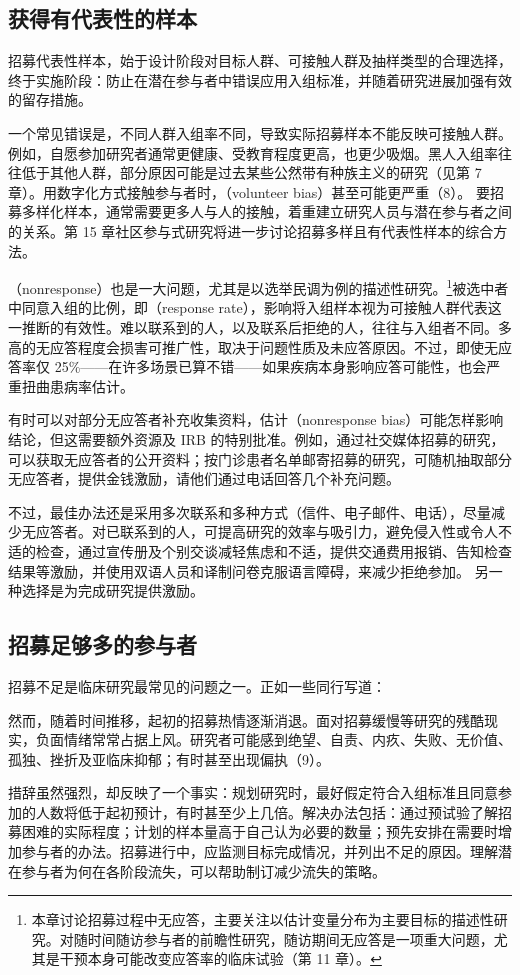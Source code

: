 \subsection{获得有代表性的样本}
招募代表性样本，始于设计阶段对目标人群、可接触人群及抽样类型的合理选择，终于实施阶段：防止在潜在参与者中错误应用入组标准，并随着研究进展加强有效的留存措施。

一个常见错误是，不同人群入组率不同，导致实际招募样本不能反映可接触人群。例如，自愿参加研究者通常更健康、受教育程度更高，也更少吸烟。黑人入组率往往低于其他人群，部分原因可能是过去某些公然带有种族主义的研究（见第 7 章）。用数字化方式接触参与者时，（volunteer bias）甚至可能更严重（8）。
要招募多样化样本，通常需要更多人与人的接触，着重建立研究人员与潜在参与者之间的关系。第 15 章社区参与式研究将进一步讨论招募多样且有代表性样本的综合方法。

（nonresponse）也是一大问题，尤其是以选举民调为例的描述性研究。\footnote{本章讨论招募过程中无应答，主要关注以估计变量分布为主要目标的描述性研究。对随时间随访参与者的前瞻性研究，随访期间无应答是一项重大问题，尤其是干预本身可能改变应答率的临床试验（第 11 章）。}被选中者中同意入组的比例，即（response rate），影响将入组样本视为可接触人群代表这一推断的有效性。难以联系到的人，以及联系后拒绝的人，往往与入组者不同。多高的无应答程度会损害可推广性，取决于问题性质及未应答原因。不过，即使无应答率仅 25\%——在许多场景已算不错——如果疾病本身影响应答可能性，也会严重扭曲患病率估计。

有时可以对部分无应答者补充收集资料，估计（nonresponse bias）可能怎样影响结论，但这需要额外资源及 IRB 的特别批准。例如，通过社交媒体招募的研究，可以获取无应答者的公开资料；按门诊患者名单邮寄招募的研究，可随机抽取部分无应答者，提供金钱激励，请他们通过电话回答几个补充问题。

不过，最佳办法还是采用多次联系和多种方式（信件、电子邮件、电话），尽量减少无应答者。对已联系到的人，可提高研究的效率与吸引力，避免侵入性或令人不适的检查，通过宣传册及个别交谈减轻焦虑和不适，提供交通费用报销、告知检查结果等激励，并使用双语人员和译制问卷克服语言障碍，来减少拒绝参加。
另一种选择是为完成研究提供激励。

\subsection{招募足够多的参与者}
招募不足是临床研究最常见的问题之一。正如一些同行写道：
\begin{studyquote}
然而，随着时间推移，起初的招募热情逐渐消退。面对招募缓慢等研究的残酷现实，负面情绪常常占据上风。研究者可能感到绝望、自责、内疚、失败、无价值、孤独、挫折及亚临床抑郁；有时甚至出现偏执（9）。
\end{studyquote}
措辞虽然强烈，却反映了一个事实：规划研究时，最好假定符合入组标准且同意参加的人数将低于起初预计，有时甚至少上几倍。解决办法包括：通过预试验了解招募困难的实际程度；计划的样本量高于自己认为必要的数量；预先安排在需要时增加参与者的办法。招募进行中，应监测目标完成情况，并列出不足的原因。理解潜在参与者为何在各阶段流失，可以帮助制订减少流失的策略。

